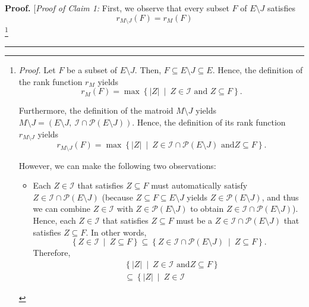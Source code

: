 \documentclass[numbers=enddot,12pt,final,onecolumn,notitlepage]{scrartcl}%
\theoremstyle{definition}
\newenvironment{proof}[1][Proof]{\noindent\textbf{#1.} }{\ \rule{0.5em}{0.5em}}
\newenvironment{verlong}{}{}
\begin{document}
\begin{verlong}
\begin{proof}
[\textit{Proof of Claim 1:} First, we observe that every subset $F$ of
$E\setminus J$ satisfies
\begin{equation}
r_{M\setminus J}\left(  F\right)  =r_{M}\left(  F\right)
\label{pf.thm.dahlwil.matroid.c1.pf.1}%
\end{equation}
\footnote{\textit{Proof.} Let $F$ be a subset of $E\setminus J$. Then,
$F\subseteq E\setminus J\subseteq E$. Hence, the definition of the rank
function $r_{M}$ yields%
\begin{equation}
r_{M}\left(  F\right)  =\max\left\{  \left\vert Z\right\vert \ \mid
\ Z\in\mathcal{I}\text{ and }Z\subseteq F\right\}  .
\label{pf.thm.dahlwil.matroid.c1.pf.1.pf.1}%
\end{equation}
\par
Furthermore, the definition of the matroid $M\setminus J$ yields $M\setminus
J=\left(  E\setminus J,\ \mathcal{I}\cap\mathcal{P}\left(  E\setminus
J\right)  \right)  $. Hence, the definition of its rank function
$r_{M\setminus J}$ yields%
\begin{equation}
r_{M\setminus J}\left(  F\right)  =\max\left\{  \left\vert Z\right\vert
\ \mid\ Z\in\mathcal{I}\cap\mathcal{P}\left(  E\setminus J\right)  \text{ and
}Z\subseteq F\right\}  . \label{pf.thm.dahlwil.matroid.c1.pf.1.pf.2}%
\end{equation}
\par
However, we can make the following two observations:
\par
\begin{itemize}
\item Each $Z\in\mathcal{I}$ that satisfies $Z\subseteq F$ must automatically
satisfy $Z\in\mathcal{I}\cap\mathcal{P}\left(  E\setminus J\right)  $ (because
$Z\subseteq F\subseteq E\setminus J$ yields $Z\in\mathcal{P}\left(  E\setminus
J\right)  $, and thus we can combine $Z\in\mathcal{I}$ with $Z\in
\mathcal{P}\left(  E\setminus J\right)  $ to obtain $Z\in\mathcal{I}%
\cap\mathcal{P}\left(  E\setminus J\right)  $). Hence, each $Z\in\mathcal{I}$
that satisfies $Z\subseteq F$ must be a $Z\in\mathcal{I}\cap\mathcal{P}\left(
E\setminus J\right)  $ that satisfies $Z\subseteq F$. In other words,%
\[
\left\{  Z\in\mathcal{I}\ \mid\ Z\subseteq F\right\}  \subseteq\left\{
Z\in\mathcal{I}\cap\mathcal{P}\left(  E\setminus J\right)  \ \mid\ Z\subseteq
F\right\}  .
\]
Therefore,%
\begin{align}
&  \left\{  \left\vert Z\right\vert \ \mid\ Z\in\mathcal{I}\text{ and
}Z\subseteq F\right\} \nonumber\\
&  \subseteq\left\{  \left\vert Z\right\vert \ \mid\ Z\in\mathcal{I}%

\end{align}
\end{itemize}}
\end{proof}
\end{verlong}
\end{document}
